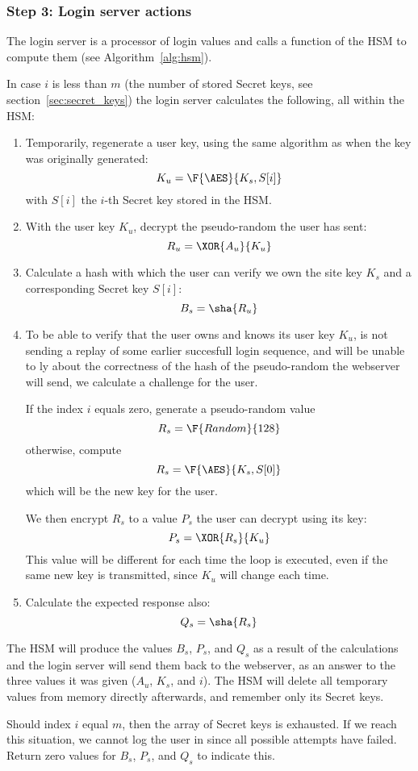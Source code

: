 \subsubsection{Step 3: Login server actions}
\label{sec:login_step3}
The login server is a processor of login values and calls a function of the HSM to compute them
(see Algorithm~\vref{alg:hsm}).
\par
In case $i$ is less than $m$
(the number of stored Secret keys, see section~\vref{sec:secret_keys})
the login server calculates the following, all within the HSM:
\begin{enumerate}
\item Temporarily, regenerate a user key, using the same algorithm as when the key was originally generated:
\[K_u=\F{\AES}{K_s,S[i]}\]
with $S[i]$ the $i$-th Secret key stored in the HSM.
\item With the user key $K_u$, decrypt the pseudo-random the user has sent:
\[R_u=\XOR{A_u}{K_u}\]
\item Calculate a hash with which the user can verify we own the site key $K_s$ and a corresponding Secret key $S[i]$:
\[B_s=\sha{R_u}\]
\item To be able to verify that the user owns and knows its user key $K_u$,
is not sending a replay of some earlier succesfull login sequence,
and will be unable to ly about the correctness of the hash of the pseudo-random the webserver will send,
we calculate a challenge for the user.
\par
If the index $i$ equals zero, generate a pseudo-random value
\[R_s=\F{Random}{128}\]
otherwise, compute
\[R_s=\F{\AES}{K_s,S[0]}\]
which will be the new key for the user.
\par
We then encrypt $R_s$ to a value $P_s$ the user can decrypt using its key:
\[P_s=\XOR{R_s}{K_u}\]
This value will be different for each time the loop is executed,
even if the same new key is transmitted,
since $K_u$ will change each time.
\item Calculate the expected response also:
\[Q_s=\sha{R_s}\]
\end{enumerate}
The HSM will produce the values $B_s$,
$P_s$,
and $Q_s$ as a result of the calculations and the login server will send them back to the webserver,
as an answer to the three values it was given ($A_u$, $K_s$, and $i$).
The HSM will delete all temporary values from memory directly afterwards, and remember only its Secret keys.
\par
Should index $i$ equal $m$, then the array of Secret keys is exhausted.
If we reach this situation, we cannot log the user in since all possible attempts have failed.
Return zero values for $B_s$, $P_s$, and $Q_s$ to indicate this.


